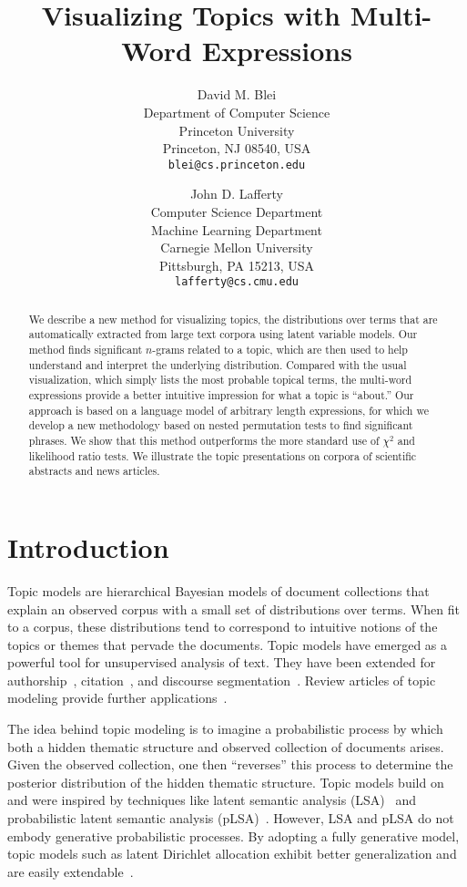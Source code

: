 \documentclass[11pt]{article}
\title{Visualizing Topics with Multi-Word Expressions}
\author{David M. Blei \\
  Department of Computer Science \\
  Princeton University \\
  Princeton, NJ 08540, USA\\
  {\tt blei@cs.princeton.edu} \and
  John D. Lafferty \\
  Computer Science Department \\
  Machine Learning Department\\
  Carnegie Mellon University \\
  Pittsburgh, PA 15213, USA\\
  {\tt lafferty@cs.cmu.edu}}
\begin{document}
\maketitle

\begin{abstract}
  We describe a new method for visualizing topics, the distributions
  over terms that are automatically extracted from large text corpora
  using latent variable models.  Our method finds significant
  $n$-grams related to a topic, which are then used to help understand
  and interpret the underlying distribution.  Compared with the usual
  visualization, which simply lists the most probable topical terms,
  the multi-word expressions provide a better intuitive impression for
  what a topic is ``about.''  Our approach is based on a language
  model of arbitrary length expressions, for which we develop a new
  methodology based on nested permutation tests to find significant
  phrases.  We show that this method outperforms the more standard use
  of $\chi^2$ and likelihood ratio tests.  We illustrate the topic
  presentations on corpora of scientific abstracts and news articles.
\end{abstract}

\section{Introduction}
\thispagestyle{empty}

Topic models are hierarchical Bayesian models of document collections
that explain an observed corpus with a small set of distributions over
terms.  When fit to a corpus, these distributions tend to correspond
to intuitive notions of the topics or themes that pervade the
documents.  Topic models have emerged as a powerful tool for
unsupervised analysis of text.  They have been extended for
authorship~\cite{Rosen-Zvi:2004}, citation~\cite{McCallum:2007}, and
discourse segmentation~\cite{Purver:2006}.  Review articles of topic
modeling provide further applications~\cite{Griffiths:2006}.

The idea behind topic modeling is to imagine a probabilistic process
by which both a hidden thematic structure and observed collection of
documents arises.  Given the observed collection, one then
``reverses'' this process to determine the posterior distribution of
the hidden thematic structure.  Topic models build on and were
inspired by techniques like latent semantic analysis
(LSA)~\cite{Deerwester:1990} and probabilistic latent semantic
analysis (pLSA)~\cite{Hofmann:1999b}.  However, LSA and pLSA do not
embody generative probabilistic processes.  By adopting a fully
generative model, topic models such as latent Dirichlet allocation
exhibit better generalization and are easily
extendable~\citep{Blei:2003b}.
\end{document}
